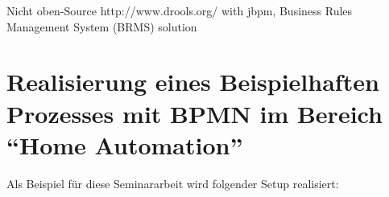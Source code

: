 \begin{itemize}
 Nicht oben-Source
 {}http://www.drools.org/ with jbpm, Business Rules Management System (BRMS) solution

\end{itemize}



\section{Realisierung eines Beispielhaften Prozesses mit BPMN im Bereich "`Home Automation"'}
Als Beispiel für diese Seminararbeit wird folgender Setup realisiert:

